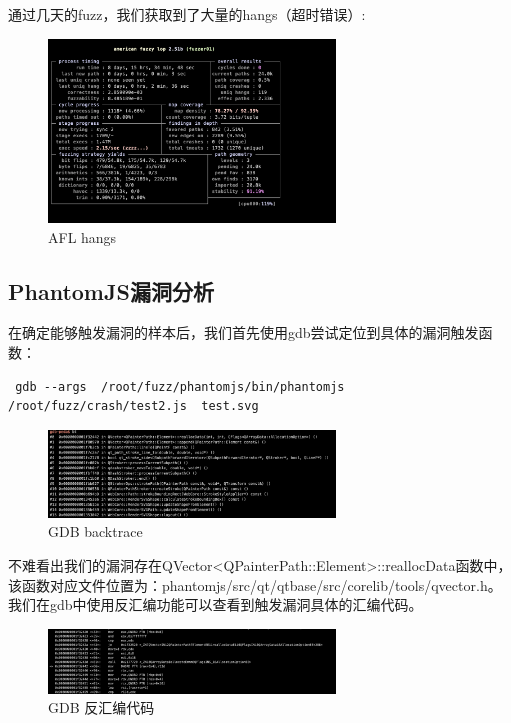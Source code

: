 \documentclass[doctor,privacy,twoside]{buaa_mac}
\begin{document}
通过几天的fuzz，我们获取到了大量的hangs（超时错误）:

\centerline{}
\begin{figure}[!h]
  \centering
  \includegraphics[width=0.68\textwidth]{images/afl_hangs.png}
  \caption{AFL hangs}
  \label{fig:logo}
\end{figure}
\centerline{}


\subsection{PhantomJS漏洞分析}

在确定能够触发漏洞的样本后，我们首先使用gdb尝试定位到具体的漏洞触发函数：

\lstset{language=JavaScript}
\begin{lstlisting}
 gdb --args  /root/fuzz/phantomjs/bin/phantomjs /root/fuzz/crash/test2.js  test.svg 
 \end{lstlisting}
 
\centerline{}
\begin{figure}[!h]
  \centering
  \includegraphics[width=0.68\textwidth]{images/gdb_backtrace.png}
  \caption{GDB backtrace}
  \label{fig:logo}
\end{figure}
\centerline{}
 
 不难看出我们的漏洞存在QVector<QPainterPath::Element>::reallocData函数中，该函数对应文件位置为：phantomjs/src/qt/qtbase/src/corelib/tools/qvector.h。 我们在gdb中使用反汇编功能可以查看到触发漏洞具体的汇编代码。
 
 \centerline{}
\begin{figure}[!h]
  \centering
  \includegraphics[width=0.68\textwidth]{images/gdb_disassemble.png}
  \caption{GDB 反汇编代码}
  \label{fig:logo}
\end{figure}
\centerline{}
 
\end{document}
